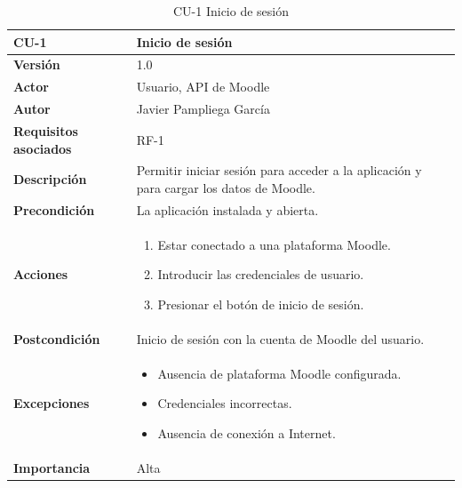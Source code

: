 \begin{table}[H]
	\centering
	\begin{tabularx}{\linewidth}{ p{} p{} }
		\toprule
		\textbf{CU-1}    & \textbf{Inicio de sesión}\\
		\toprule
		\textbf{Versión}              & 1.0    \\
            \textbf{Actor}                & Usuario, API de Moodle \\
		\textbf{Autor}                & Javier Pampliega García \\
		\textbf{Requisitos asociados} & RF-1\\
		\textbf{Descripción}          & Permitir iniciar sesión para acceder a la aplicación y para cargar los datos de Moodle. \\
		\textbf{Precondición}         & La aplicación instalada y abierta. \\
		\textbf{Acciones}             &
		\begin{enumerate}
			\def\labelenumi{\arabic{enumi}.}
			\tightlist
			\item Estar conectado a una plataforma Moodle.
			\item Introducir las credenciales de usuario.
                \item Presionar el botón de inicio de sesión.
		\end{enumerate}\\
		\textbf{Postcondición}        & Inicio de sesión con la cuenta de Moodle del usuario. \\
		\textbf{Excepciones}          & \begin{itemize}
		    \item Ausencia de plataforma Moodle configurada.
                \item Credenciales incorrectas.
                \item Ausencia de conexión a Internet.
		\end{itemize} \\
		\textbf{Importancia}          & Alta \\
		\bottomrule
	\end{tabularx}
	\caption{CU-1 Inicio de sesión}
\end{table}

